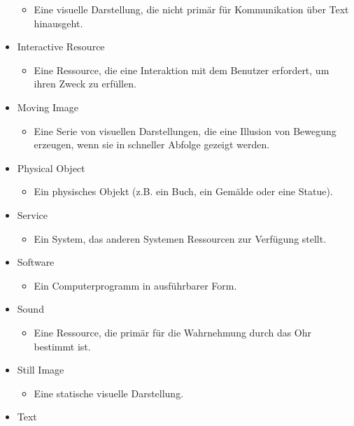 \documentclass[
  letterpaper,
  DIV=11,
  numbers=noendperiod,
  landscape,
  a4paper,
  geometry:margin=1in]{scrartcl}
\providecommand{\tightlist}{%
  \setlength{\itemsep}{0pt}\setlength{\parskip}{0pt}}\usepackage{longtable,booktabs,array}
\begin{document}
\begin{longtable}[]
\begin{minipage}[t]{\linewidth}
\begin{itemize}
  \begin{itemize}
  \tightlist
  \item
    Eine visuelle Darstellung, die nicht primär für Kommunikation über
    Text hinausgeht.
  \end{itemize}
\item
  Interactive Resource

  \begin{itemize}
  \tightlist
  \item
    Eine Ressource, die eine Interaktion mit dem Benutzer erfordert, um
    ihren Zweck zu erfüllen.
  \end{itemize}
\item
  Moving Image

  \begin{itemize}
  \tightlist
  \item
    Eine Serie von visuellen Darstellungen, die eine Illusion von
    Bewegung erzeugen, wenn sie in schneller Abfolge gezeigt werden.
  \end{itemize}
\item
  Physical Object

  \begin{itemize}
  \tightlist
  \item
    Ein physisches Objekt (z.B. ein Buch, ein Gemälde oder eine Statue).
  \end{itemize}
\item
  Service

  \begin{itemize}
  \tightlist
  \item
    Ein System, das anderen Systemen Ressourcen zur Verfügung stellt.
  \end{itemize}
\item
  Software

  \begin{itemize}
  \tightlist
  \item
    Ein Computerprogramm in ausführbarer Form.
  \end{itemize}
\item
  Sound

  \begin{itemize}
  \tightlist
  \item
    Eine Ressource, die primär für die Wahrnehmung durch das Ohr
    bestimmt ist.
  \end{itemize}
\item
  Still Image

  \begin{itemize}
  \tightlist
  \item
    Eine statische visuelle Darstellung.
  \end{itemize}
\item
  Text


\end{itemize}
\end{minipage}
\end{longtable}
\end{document}
